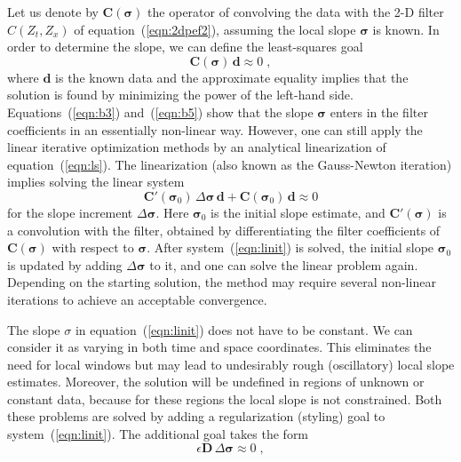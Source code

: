 Let us denote by $\mathbf{C}(\mathbf{\sigma})$ the operator of convolving the
data with the 2-D filter $C(Z_t,Z_x)$ of equation~(\ref{eqn:2dpef2}),
assuming the local slope $\mathbf{\sigma}$ is known. In order to determine 
the slope, we can define the least-squares goal
\begin{equation}
  \label{eqn:ls}
  \mathbf{C}(\mathbf{\sigma}) \, \mathbf{d} \approx 0\;,
\end{equation}
where $\mathbf{d}$ is the known data and the approximate equality
implies that the solution is found by minimizing the power of the
left-hand side. Equations~(\ref{eqn:b3}) and~(\ref{eqn:b5}) show that
the slope $\mathbf{\sigma}$ enters in the filter coefficients in an
essentially non-linear way. However, one can still apply the linear
iterative optimization methods by an analytical linearization of
equation~(\ref{eqn:ls}). The linearization (also known as the Gauss-Newton
iteration) implies solving the linear system
\begin{equation}
  \label{eqn:linit}
  \mathbf{C}'(\mathbf{\sigma}_0) \, \Delta \mathbf{\sigma} \,
  \mathbf{d}  + \mathbf{C}(\mathbf{\sigma}_0) \, \mathbf{d} \approx 0
\end{equation}
for the slope increment $\Delta \mathbf{\sigma}$. Here $\mathbf{\sigma}_0$
is the initial slope estimate, and $\mathbf{C}'(\mathbf{\sigma})$ is a
convolution with the filter, obtained by differentiating the filter
coefficients of $\mathbf{C}(\mathbf{\sigma})$ with respect to
$\mathbf{\sigma}$. After system~(\ref{eqn:linit}) is solved, the initial
slope $\mathbf{\sigma}_0$ is updated by adding $\Delta \mathbf{\sigma}$ to
it, and one can solve the linear problem again. Depending on the
starting solution, the method may require several non-linear
iterations to achieve an acceptable convergence. 
\par
The slope $\sigma$ in equation~(\ref{eqn:linit}) does not have to be
constant. We can consider it as varying in both time and space
coordinates.  This eliminates the need for local windows but may lead
to undesirably rough (oscillatory) local slope estimates.  Moreover,
the solution will be undefined in regions of unknown or constant data,
because for these regions the local slope is not constrained.  Both
these problems are solved by adding a regularization (styling) goal to
system~(\ref{eqn:linit}). The additional goal takes the form
\begin{equation}
  \label{eqn:regs}
  \epsilon \mathbf{D} \, \Delta \mathbf{\sigma} \approx 0\;,
\end{equation}
